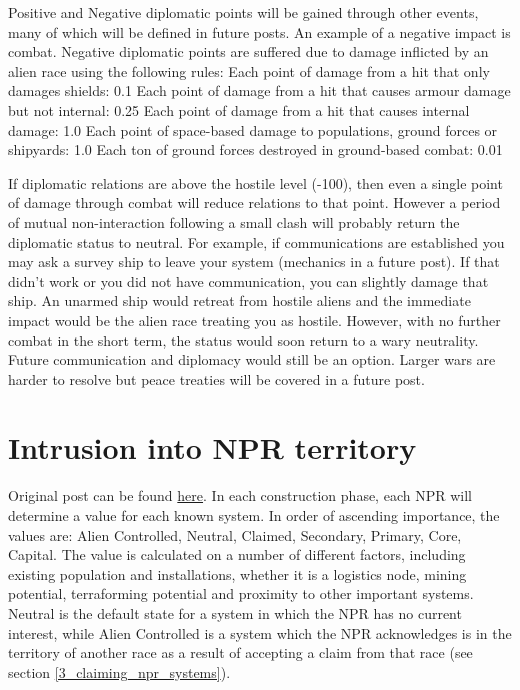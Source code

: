 \documentclass[../Aurora C# unofficial manual.tex]{subfiles}
\begin{document}
	Positive and Negative diplomatic points will be gained through other events, many of which will be defined in future posts. An example of a negative impact is combat. Negative diplomatic points are suffered due to damage inflicted by an alien race using the following rules:\newline
	Each point of damage from a hit that only damages shields: 0.1\newline
	Each point of damage from a hit that causes armour damage but not internal: 0.25\newline
	Each point of damage from a hit that causes internal damage: 1.0\newline
	Each point of space-based damage to populations, ground forces or shipyards: 1.0\newline
	Each ton of ground forces destroyed in ground-based combat: 0.01\newline
	
	If diplomatic relations are above the hostile level (-100), then even a single point of damage through combat will reduce relations to that point. However a period of mutual non-interaction following a small clash will probably return the diplomatic status to neutral. For example, if communications are established you may ask a survey ship to leave your system (mechanics in a future post). If that didn't work or you did not have communication, you can slightly damage that ship. An unarmed ship would retreat from hostile aliens and the immediate impact would be the alien race treating you as hostile. However, with no further combat in the short term, the status would soon return to a wary neutrality. Future communication and diplomacy would still be an option. Larger wars are harder to resolve but peace treaties will be covered in a future post.
	
	\section{Intrusion into NPR territory}\label{2_intrusion_into_npr}
	Original post can be found
	\href{http://aurora2.pentarch.org/index.php?topic=8495.msg118318#msg118318}{here}.
	\newline\newline
	In each construction phase, each NPR will determine a value for each known system. In order of ascending importance, the values are: Alien Controlled, Neutral, Claimed, Secondary, Primary, Core, Capital. The value is calculated on a number of different factors, including existing population and installations, whether it is a logistics node, mining potential, terraforming potential and proximity to other important systems. Neutral is the default state for a system in which the NPR has no current interest, while Alien Controlled is a system which the NPR acknowledges is in the territory of another race as a result of accepting a claim from that race (see section \ref{3_claiming_npr_systems}).
	
\end{document}
